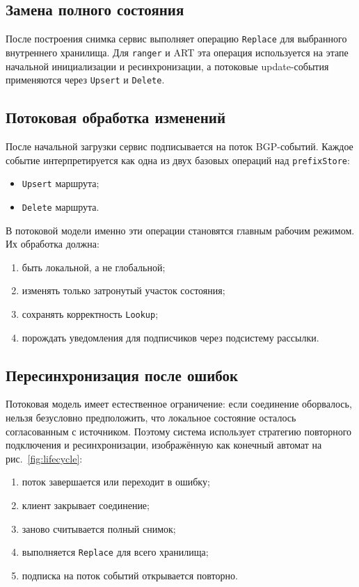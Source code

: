 \subsection{Замена полного состояния}

После построения снимка сервис выполняет операцию \texttt{Replace} для
выбранного внутреннего хранилища. Для \texttt{ranger} и ART эта операция
используется на этапе начальной инициализации и ресинхронизации, а
потоковые update-события применяются через \texttt{Upsert} и
\texttt{Delete}.

\subsection{Потоковая обработка изменений}

После начальной загрузки сервис подписывается на поток BGP-событий.
Каждое событие интерпретируется как одна из двух базовых операций над
\texttt{prefixStore}:

\begin{itemize}
\item \texttt{Upsert} маршрута;
\item \texttt{Delete} маршрута.
\end{itemize}

В потоковой модели именно эти операции становятся главным рабочим
режимом. Их обработка должна:

\begin{enumerate}
\item быть локальной, а не глобальной;
\item изменять только затронутый участок состояния;
\item сохранять корректность \texttt{Lookup};
\item порождать уведомления для подписчиков через подсистему рассылки.
\end{enumerate}

\subsection{Пересинхронизация после ошибок}

Потоковая модель имеет естественное ограничение: если соединение
оборвалось, нельзя безусловно предположить, что локальное состояние
осталось согласованным с источником. Поэтому система использует стратегию
повторного подключения и ресинхронизации, изображённую как конечный
автомат на рис.~\ref{fig:lifecycle}:

\begin{enumerate}
\item поток завершается или переходит в ошибку;
\item клиент закрывает соединение;
\item заново считывается полный снимок;
\item выполняется \texttt{Replace} для всего хранилища;
\item подписка на поток событий открывается повторно.
\end{enumerate}


